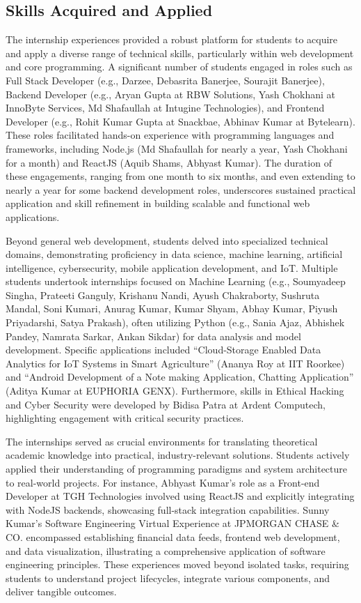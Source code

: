 \documentclass[11pt,a4paper]{article}
\newenvironment{card}{
    \begin{tcolorbox}[
        enhanced,
        colback=cardback,
        colframe=border,
        sharp corners,
        boxrule=0.5pt,
        drop shadow,
        drop shadow={shadow xshift=1mm,shadow yshift=-1mm,fill=border!50},
        boxsep=3mm,
        left=5mm, right=5mm, top=5mm, bottom=5mm,
        width=\textwidth,
        nobeforeafter
    ]
}{\end{tcolorbox}}
\begin{document}
\begin{card}
    \subsection*{\textcolor{accent}{Skills Acquired and Applied}}
    \vspace{0.3cm}
    The internship experiences provided a robust platform for students to acquire and apply a diverse range of technical skills, particularly within web development and core programming. A significant number of students engaged in roles such as Full Stack Developer (e.g., Darzee, Debasrita Banerjee, Sourajit Banerjee), Backend Developer (e.g., Aryan Gupta at RBW Solutions, Yash Chokhani at InnoByte Services, Md Shafaullah at Intugine Technologies), and Frontend Developer (e.g., Rohit Kumar Gupta at Snackbae, Abhinav Kumar at Bytelearn). These roles facilitated hands-on experience with programming languages and frameworks, including Node.js (Md Shafaullah for nearly a year, Yash Chokhani for a month) and ReactJS (Aquib Shams, Abhyast Kumar). The duration of these engagements, ranging from one month to six months, and even extending to nearly a year for some backend development roles, underscores sustained practical application and skill refinement in building scalable and functional web applications.

    Beyond general web development, students delved into specialized technical domains, demonstrating proficiency in data science, machine learning, artificial intelligence, cybersecurity, mobile application development, and IoT. Multiple students undertook internships focused on Machine Learning (e.g., Soumyadeep Singha, Prateeti Ganguly, Krishanu Nandi, Ayush Chakraborty, Sushruta Mandal, Soni Kumari, Anurag Kumar, Kumar Shyam, Abhay Kumar, Piyush Priyadarshi, Satya Prakash), often utilizing Python (e.g., Sania Ajaz, Abhishek Pandey, Namrata Sarkar, Ankan Sikdar) for data analysis and model development. Specific applications included ``Cloud-Storage Enabled Data Analytics for IoT Systems in Smart Agriculture'' (Ananya Roy at IIT Roorkee) and ``Android Development of a Note making Application, Chatting Application'' (Aditya Kumar at EUPHORIA GENX). Furthermore, skills in Ethical Hacking and Cyber Security were developed by Bidisa Patra at Ardent Computech, highlighting engagement with critical security practices.

    The internships served as crucial environments for translating theoretical academic knowledge into practical, industry-relevant solutions. Students actively applied their understanding of programming paradigms and system architecture to real-world projects. For instance, Abhyast Kumar's role as a Front-end Developer at TGH Technologies involved using ReactJS and explicitly integrating with NodeJS backends, showcasing full-stack integration capabilities. Sunny Kumar's Software Engineering Virtual Experience at JPMORGAN CHASE \& CO. encompassed establishing financial data feeds, frontend web development, and data visualization, illustrating a comprehensive application of software engineering principles. These experiences moved beyond isolated tasks, requiring students to understand project lifecycles, integrate various components, and deliver tangible outcomes.


\end{card}
\end{document}
